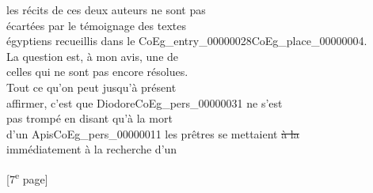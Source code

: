 \documentclass{book}
\begin{document}
{\begin{paracol}{2}
les récits de ces deux auteurs ne sont pas\\
écartées par le témoignage des textes\\
égyptiens recueillis dans le \Gls{CoEg_entry_00000028}\gls{CoEg_place_00000004}.\\
La question est, à mon avis, une de\\
celles qui ne sont pas encore résolues.\\
Tout ce qu’on peut jusqu’à présent\\
affirmer, c’est que Diodore\gls{CoEg_pers_00000031} ne s’est\\
pas trompé en disant qu’à la mort\\
d’un Apis\gls{CoEg_pers_00000011} les prêtres se mettaient \sout{à la}\\
immédiatement à la recherche d’un
\end{paracol}

{\footnotesize\begin{center} {[7\textsuperscript{e} page]}\end{center}}

}
\end{document}

